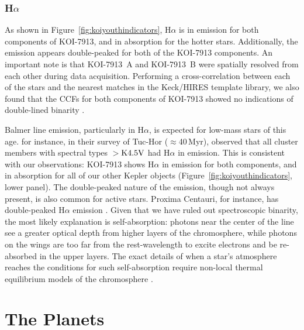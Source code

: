 \documentclass[12pt,twocolumn,tighten,linenumbers]{aastex63}
\begin{document}
\subsubsection{H$\alpha$}

As shown in Figure~\ref{fig:koiyouthindicators}, H$\alpha$ is in
emission for both components of KOI-7913, and in absorption for the
hotter stars.  Additionally, the emission appears double-peaked for
both of the KOI-7913 components.  An important note is that KOI-7913~A and
KOI-7913~B were spatially resolved from each other during data
acquisition.  Performing a cross-correlation between each of the stars
and the nearest matches in the Keck/HIRES template library, we also
found that the CCFs for both components of KOI-7913 showed no
indications of double-lined binarity \citep{kolbl_detection_2015}.

Balmer line emission, particularly in H$\alpha$, is expected for
low-mass stars of this age.  \citet{kraus_stellar_2014} for instance, in their
survey of Tuc-Hor ($\approx$40\,Myr), observed that all
cluster members with spectral types $>$${\rm K4.5V}$ had H$\alpha$ in
emission.  This is consistent with our observations: KOI-7913 shows
H$\alpha$ in emission for both components, and in absorption
for all of our other Kepler objects (Figure~\ref{fig:koiyouthindicators}, lower panel).  The double-peaked nature of the
emission, though not always present, is also common for
active stars.  Proxima Centauri, for instance, has double-peaked
H$\alpha$ emission \citep{collins_calculations_2017}.  Given
that we have ruled out spectroscopic binarity, the most
likely
explanation is self-absorption: photons near the center of the line
see a greater optical depth from higher layers of the chromosphere,
while photons on the wings are too far from the
rest-wavelength to excite electrons and be re-absorbed in the upper
layers.  The exact details of when a star's atmosphere reaches the
conditions for such self-absorption require non-local thermal
equilibrium models of the chromosphere
\citep{short_chromospheric_1998,2005A&A...439.1137F}.







\section{The Planets}
\label{sec:planets}
\end{document}
